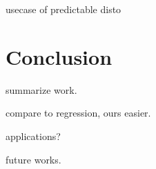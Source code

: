 \documentclass[a4paper,12pt]{report}
\begin{document}
usecase of predictable disto


\chapter{Conclusion}
\label{chap:conclusion}

summarize work.

compare to regression, ours easier.

applications?


future works.

{}


\nocite{lecun2004learning}
\end{document}
